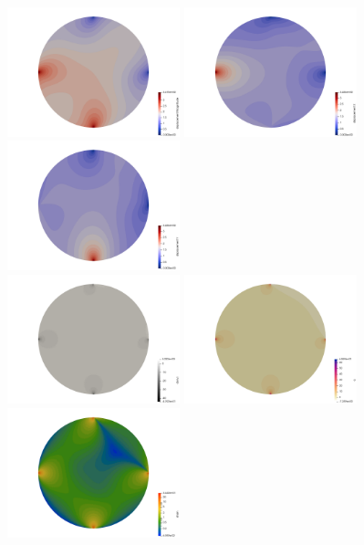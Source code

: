 \begin{center}
\includegraphics[width=5cm]{python_codes/fieldstone_58/experiment2/displ}
\includegraphics[width=5cm]{python_codes/fieldstone_58/experiment2/displx}
\includegraphics[width=5cm]{python_codes/fieldstone_58/experiment2/disply}\\
\includegraphics[width=5cm]{python_codes/fieldstone_58/experiment2/divv}
\includegraphics[width=5cm]{python_codes/fieldstone_58/experiment2/p}
\includegraphics[width=5cm]{python_codes/fieldstone_58/experiment2/strain}\\

\end{center}
